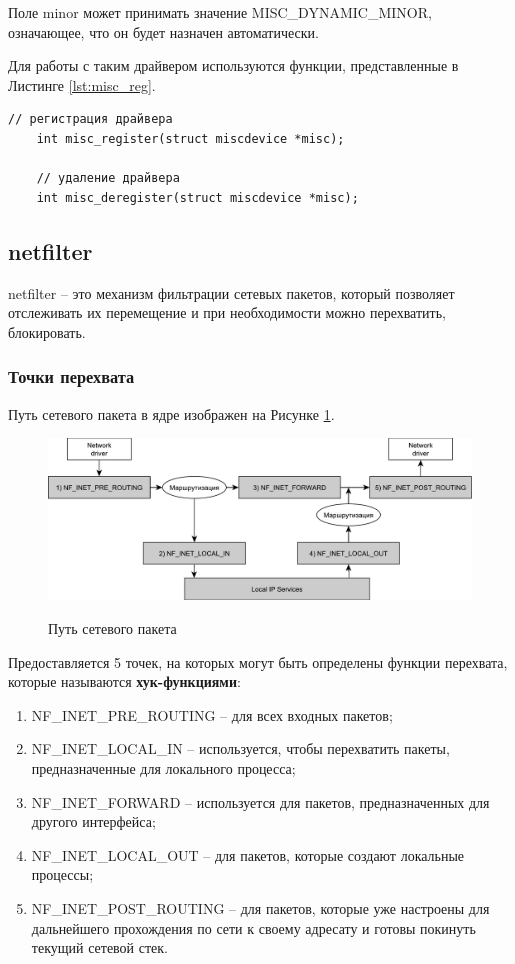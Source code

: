 Поле minor может принимать значение MISC\_DYNAMIC\_MINOR, означающее, что он будет назначен автоматически. \cite{3d}

Для работы с таким драйвером используются функции, представленные в Листинге \ref{lst:misc_reg}.
\begin{lstlisting}[caption = {Функции для регистрации и удаления misc драйвера}, label=lst:misc_reg]
	// регистрация драйвера
	int misc_register(struct miscdevice *misc);
	
	// удаление драйвера
	int misc_deregister(struct miscdevice *misc);
\end{lstlisting}

\subsection{netfilter}
netfilter -- это механизм фильтрации сетевых пакетов, который позволяет отслеживать их перемещение и при необходимости можно перехватить, блокировать. \cite{hook} \newline

\subsubsection{Точки перехвата}
Путь сетевого пакета в ядре изображен на Рисунке \ref{fig2:image}. \\

\begin{figure}[ph!]
	\centering
	\begin{center}
		{\includegraphics[scale=0.6]{img/packets.pdf}}
		\caption{Путь сетевого пакета}
		\label{fig2:image}
	\end{center}
\end{figure}

Предоставляется 5 точек, на которых могут быть определены функции перехвата, которые называются \textbf{хук-функциями}:
\begin{enumerate}
	\item NF\_INET\_PRE\_ROUTING – для всех входных пакетов;
	\item NF\_INET\_LOCAL\_IN – используется, чтобы перехватить пакеты, предназначенные для локального процесса;
	\item NF\_INET\_FORWARD – используется для пакетов, предназначенных для другого интерфейса;
	\item NF\_INET\_LOCAL\_OUT – для пакетов, которые создают локальные процессы;
	\item NF\_INET\_POST\_ROUTING – для пакетов, которые уже настроены для дальнейшего прохождения по сети к своему адресату и готовы покинуть текущий сетевой стек. \newline
\end{enumerate}


